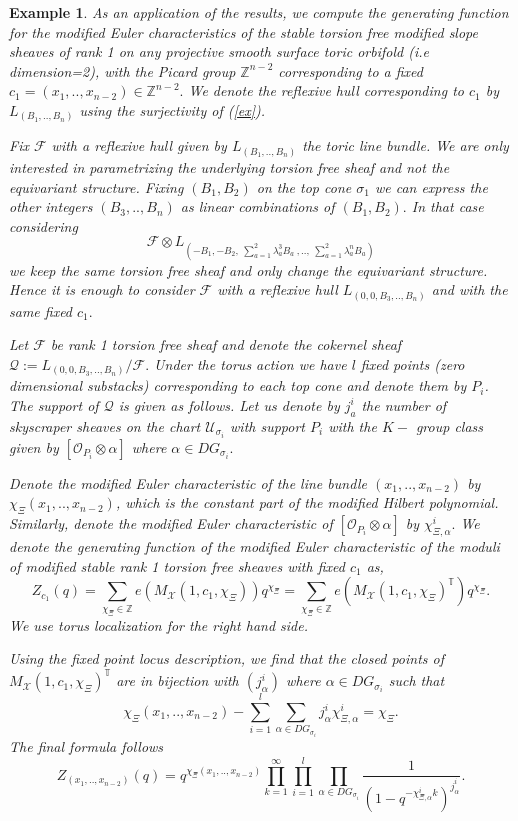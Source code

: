 \documentclass[10pt]{amsart}
\newtheorem{example}{Example}
\newcommand{\sO}{{\mathcal O}}
\newcommand{\sX}{{\mathcal X}}
\numberwithin{equation}{subsection}
\begin{document}
\begin{example}
As an application of the results, we compute the generating function for the modified Euler characteristics of the stable torsion free modified slope sheaves of rank 1 on any projective smooth surface toric orbifold (i.e dimension=2), with the Picard group $\mathbb{Z}^{n-2}$ corresponding to a fixed $c_1=(x_1,..,x_{n-2}) \in \mathbb{Z}^{n-2}.$ We denote the reflexive hull corresponding to $c_1$ by $L_{(B_1,..,B_n)}$ using the surjectivity of (\ref{ex}). \par 
Fix $\mathscr{F}$ with a reflexive hull given by $L_{(B_1,..,B_n)}$ the toric line bundle. We are only interested in parametrizing the underlying torsion free sheaf and not the equivariant structure. Fixing $(B_1,B_2)$ on the top cone $\sigma_1$ we can express the other integers $(B_{3},..,B_n)$ as linear combinations of $(B_1,B_2).$ In that case considering $$\mathscr{F}\otimes L_{(-B_1,-B_2,\ \sum_{a=1}^{2}\lambda_a^3B_a\ ,..,\ \sum_{a=1}^{2}\lambda_a^{n}B_a)}$$ we keep the same torsion free sheaf and only change the equivariant structure. Hence it is enough to consider $\mathscr{F}$ with a reflexive hull $L_{(0,0,B_{3},..,B_{n})}$ and with the same fixed $c_1.$\par
Let $\mathscr{F}$ be rank 1 torsion free sheaf and denote the cokernel sheaf $\mathscr{Q}:=L_{(0,0,B_{3},..,B_n)}/\mathscr{F}.$ Under the torus action we have $l$ fixed points (zero dimensional substacks) corresponding to each top cone and denote them by $P_i$. The support of $\mathscr{Q}$ is given as follows. Let us denote by $j^i_a$ the number of skyscraper sheaves on the chart $\mathscr{U}_{\sigma_i}$ with support $P_i$ with the $K-$ group class given by $[\sO_{P_i}\otimes \alpha]$ where $\alpha \in DG_{\sigma_i}.$ \par 
Denote the modified Euler characteristic of the line bundle $(x_1,..,x_{n-2})$ by $\chi_{\Xi}(x_1,..,x_{n-2})$, which is the constant part of the modified Hilbert polynomial. Similarly, denote the modified Euler characteristic of 
$[\sO_{P_i}\otimes \alpha]$ by $\chi_{\Xi,\alpha}^{i}.$
We denote the generating function of the modified Euler characteristic of the moduli of modified stable rank 1 torsion free sheaves with fixed $c_1$ as,
$$Z_{c_1}(q)=\sum_{\chi_{\Xi}\in \mathbb{Z}}e(M_{\sX}(1,c_1,\chi_{\Xi}))q^{\chi_{\Xi}}=\sum_{\chi_{\Xi}\in \mathbb{Z}}e(M_{\sX}(1,c_1,\chi_{\Xi})^{\mathbb{T}})q^{\chi_{\Xi}}.$$
We use torus localization for the right hand side.\par  Using the fixed point locus description, we find that the closed points of $M_{\sX}(1,c_1,\chi_{\Xi})^{\mathbb{T}}$ are in bijection with $(j^i_{\alpha})$ where $\alpha \in DG_{\sigma_{i}}$ such that 
$$\chi_{\Xi}(x_1,..,x_{n-2})-\sum_{i=1}^{l}\sum_{\alpha\in DG_{\sigma_i}}j^{i}_{\alpha}\chi_{\Xi,\alpha}^{i}=\chi_{\Xi}.$$
The final formula follows
$$Z_{(x_1,..,x_{n-2})}(q)=q^{\chi_{\Xi}(x_1,..,x_{n-2})}\prod_{k=1}^{\infty}\prod_{i=1}^{l}\prod_{\alpha \in DG_{\sigma_i}}\frac{1}{(1-q^{-\chi^i_{\Xi,\alpha}k})^{j^i_{\alpha}}}.$$
\end{example}
\end{document}
